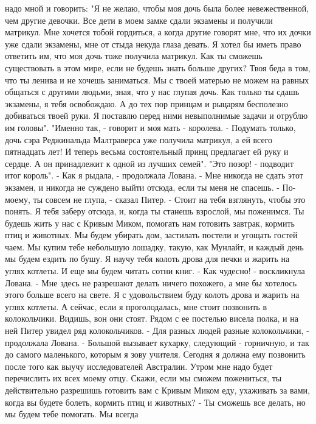 надо мной и говорить: "Я не желаю, чтобы моя дочь была более 
невежественной, чем другие девочки. Все дети в моем замке сдали 
экзамены и получили матрикул. Мне хочется тобой гордиться, а когда 
другие говорят мне, что их дочки уже сдали экзамены, мне от стыда 
некуда глаза девать. Я хотел бы иметь право ответить им, что моя дочь 
тоже получила матрикул. Как ты сможешь существовать в этом мире, если 
не будешь знать больше других? Твоя беда в том, что ты ленива и не 
хочешь заниматься. Мы с твоей матерью не можем на равных общаться с 
другими людьми, зная, что у нас глупая дочь. Как только ты сдашь 
экзамены, я тебя освобождаю. А до тех пор принцам и рыцарям бесполезно 
добиваться твоей руки. Я поставлю перед ними невыполнимые задачи и 
отрублю им головы".
    "Именно так, - говорит и моя мать - королева. - Подумать только, 
дочь сэра Реджинальда Малтраверса уже получила матрикул, а ей всего 
пятнадцать лет! И теперь весьма состоятельный принц предлагает ей руку 
и сердце. А он принадлежит к одной из лучших семей".
    "Это позор! - подводит итог король".
    - Как я рыдала, - продолжала Лована. - Мне никогда не сдать этот 
экзамен, и никогда не суждено выйти отсюда, если ты меня не спасешь.
    - По-моему, ты совсем не глупа, - сказал Питер. - Стоит на тебя 
взглянуть, чтобы это понять. Я тебя заберу отсюда, и, когда ты станешь 
взрослой, мы поженимся. Ты будешь жить у нас с Кривым Миком, помогать 
нам готовить завтрак, кормить птиц и животных. Мы будем убирать дом, 
застилать постели и угощать гостей чаем. Мы купим тебе небольшую 
лошадку, такую, как Мунлайт, и каждый день мы будем ездить по бушу. Я 
научу тебя колоть дрова для печки и жарить на углях котлеты. И еще мы 
будем читать сотни книг.
    - Как чудесно! - воскликнула Лована. - Мне здесь не разрешают 
делать ничего похожего, а мне бы хотелось этого больше всего на свете. 
Я с удовольствием буду колоть дрова и жарить на углях котлеты. А 
сейчас, если я проголодалась, мне стоит позвонить в колокольчики. 
Видишь, вон они стоят.
    Рядом с ее постелью висела полка, и на ней Питер увидел ряд 
колокольчиков.
    - Для разных людей разные колокольчики, - продолжала Лована. - 
Большой вызывает кухарку, следующий - горничную, и так до самого 
маленького, которым я зову учителя. Сегодня я должна ему позвонить 
после того как выучу исследователей Австралии. Утром мне надо будет 
перечислить их всех моему отцу. Скажи, если мы сможем пожениться, ты 
действительно разрешишь готовить вам с Кривым Миком еду, ухаживать за 
вами, когда вы будете болеть, кормить птиц и животных?
    - Ты сможешь все делать, но мы будем тебе помогать. Мы всегда 

